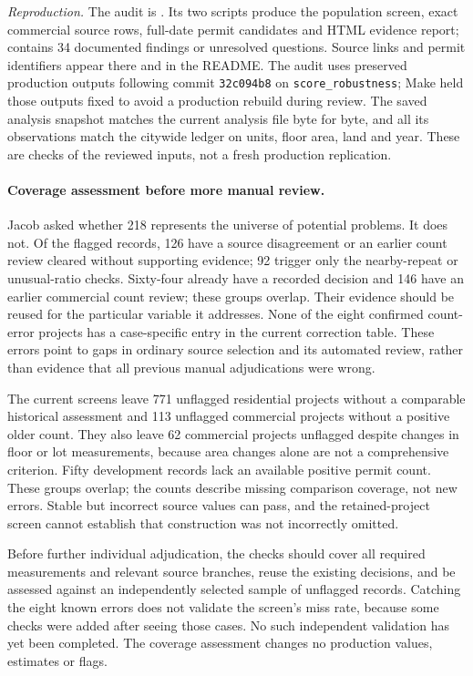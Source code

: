 \textit{Reproduction.} The audit is
. Its two scripts
produce the population screen, exact commercial source rows, full-date
permit candidates and HTML evidence report; 
contains 34 documented findings or unresolved questions. Source links
and permit identifiers appear there and in the README. The audit uses
preserved production outputs following commit \texttt{32c094b8} on
\texttt{score\_robustness}; Make held those outputs fixed to avoid a
production rebuild during review. The saved analysis snapshot matches
the current analysis file byte for byte, and all its observations match
the citywide ledger on units, floor area, land and year. These are
checks of the reviewed inputs, not a fresh production replication.

\paragraph{Coverage assessment before more manual review.}
Jacob asked whether 218 represents the universe of potential problems.
It does not. Of the flagged records, 126 have a source disagreement or an
earlier count review cleared without supporting evidence; 92 trigger
only the nearby-repeat or unusual-ratio checks. Sixty-four already have
a recorded decision and 146 have an earlier commercial count review;
these groups overlap. Their evidence should be reused for the particular
variable it addresses. None of the eight confirmed count-error projects
has a case-specific entry in the current correction table. These errors
point to gaps in ordinary source selection and its automated review,
rather than evidence that all previous manual adjudications were wrong.

The current screens leave 771 unflagged residential projects without a
comparable historical assessment and 113 unflagged commercial projects
without a positive older count. They also leave 62 commercial projects
unflagged despite changes in floor or lot measurements, because area
changes alone are not a comprehensive criterion. Fifty development
records lack an available positive permit count. These groups overlap;
the counts describe missing comparison coverage, not new errors. Stable
but incorrect source values can pass, and the retained-project screen
cannot establish that construction was not incorrectly omitted.

Before further individual adjudication, the checks should cover all
required measurements and relevant source branches, reuse the existing
decisions, and be assessed against an independently selected sample of
unflagged records. Catching the eight known errors does not validate the
screen's miss rate, because some checks were added after seeing those
cases. No such independent validation has yet been completed. The
coverage assessment changes no production values, estimates or flags.
